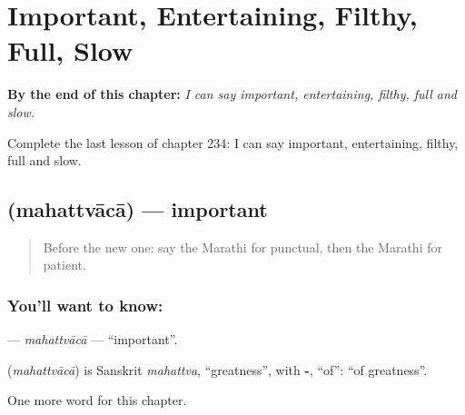 
\chapter{Important, Entertaining, Filthy, Full, Slow}
\label{ch:mr-important-entertaining-filthy-full-slow}

\begin{chapteropening}
\textbf{By the end of this chapter:} \emph{I can say important, entertaining, filthy, full and slow.}

Complete the last lesson of chapter 234: I can say important, entertaining, filthy, full and slow.
\end{chapteropening}

\section[\texorpdfstring{\mr{महत्त्वाचा} (mahattvācā)}{महत्त्वाचा (mahattvācā)}]{ (mahattvācā) — important}

\label{lesson:MR-C234-mahattvaca}



\begin{quote}
Before the new one: say the Marathi for punctual, then the Marathi for patient.
\end{quote}

\subsection*{You'll want to know: }
\textbf{} — \emph{mahattvācā} — \textquotedblleft{}important\textquotedblright{}.

\begin{cousinweb}
\textbf{} (\emph{mahattvācā}) is Sanskrit \emph{mahattva}, \textquotedblleft{}greatness\textquotedblright{}, with \textbf{-}, \textquotedblleft{}of\textquotedblright{}: \textquotedblleft{}of greatness\textquotedblright{}.
\end{cousinweb}

\begin{grammarlens}[title={What you've built}]
One more word for this chapter.
\end{grammarlens}

